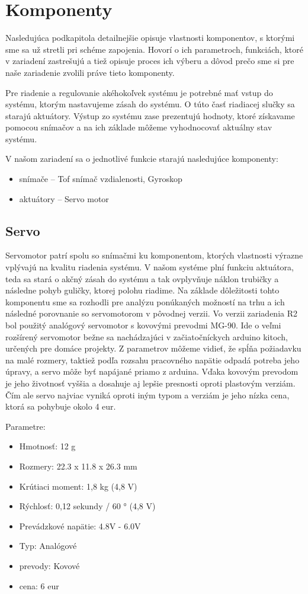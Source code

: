 \section{Komponenty}
\label{kap:2.2}

Nasledujúca podkapitola detailnejšie opisuje vlastnosti komponentov, s ktorými sme sa už stretli pri schéme zapojenia. Hovorí o ich parametroch, funkciách, ktoré v zariadení zastrešujú a tiež opisuje proces ich výberu a dôvod prečo sme si pre naše zariadenie zvolili práve tieto komponenty. 

Pre riadenie a regulovanie akéhokoľvek systému je potrebné mať vstup do systému, ktorým nastavujeme zásah do systému. O túto časť riadiacej slučky sa starajú aktuátory. Výstup zo systému zase prezentujú hodnoty, ktoré získavame pomocou snímačov a na ich základe môžeme vyhodnocovať aktuálny stav systému.


V našom zariadení sa o jednotlivé funkcie starajú nasledujúce komponenty:
\begin{itemize}
    \item snímače – Tof snímač vzdialenosti, Gyroskop
	\item aktuátory – Servo motor 
\end{itemize}


\subsection{Servo}
\label{kap:2.2.1}
Servomotor patrí spolu so snímačmi ku komponentom, ktorých vlastnosti výrazne vplývajú na kvalitu riadenia systému. V našom systéme plní funkciu aktuátora, teda sa stará o akčný zásah do systému a tak ovplyvňuje náklon trubičky a následne pohyb guličky, ktorej polohu riadime. Na základe dôležitosti tohto komponentu sme sa rozhodli pre analýzu ponúkaných možností na trhu a ich následné porovnanie so servomotorom v pôvodnej verzii. Vo verzii zariadenia R2 bol použitý analógový servomotor  s kovovými prevodmi MG-90. Ide o veľmi rozšírený servomotor bežne sa nachádzajúci v začiatočníckych arduino kitoch, určených pre domáce projekty. Z parametrov môžeme vidieť, že spĺňa požiadavku na malé rozmery, taktiež podľa rozsahu pracovného napätie odpadá potreba jeho úpravy, a servo môže byť napájané priamo z arduina. Vďaka kovovým prevodom je jeho životnosť vyššia a dosahuje aj  lepšie presnosti oproti plastovým verziám. Čím ale servo najviac vyniká oproti iným typom a verziám je jeho nízka cena, ktorá sa pohybuje okolo 4 eur.  

Parametre:
\begin{itemize}
	\item Hmotnosť: 12 g
	\item 	Rozmery: 22.3 x 11.8 x 26.3 mm 
	\item 	Krútiaci moment: 1,8 kg (4,8 V)
	\item   Rýchlosť: 0,12 sekundy / 60 ° (4,8 V)
	\item	Prevádzkové napätie: 4.8V - 6.0V 
	\item 	Typ: Analógové
	\item	prevody: Kovové
	\item 	cena: 6 eur
\end{itemize}

